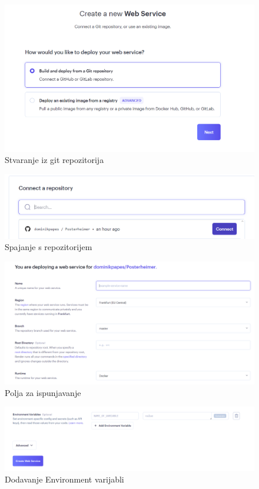 			\begin{figure} [H]
				\includegraphics[width=\linewidth]{Slike/Stvaranje iz git repozitorija}
				\caption{Stvaranje iz git repozitorija}
			\end{figure}
			
			\begin{figure} [H]
				\includegraphics[width=\linewidth]{Slike/Spajanje s repozitorijem}
				\caption{Spajanje s repozitorijem}
			\end{figure}
			
			\begin{figure} [H]
				\includegraphics[width=\linewidth]{Slike/Polja za ispunjavanje}
				\caption{Polja za ispunjavanje}
			\end{figure}
			
			\begin{figure} [H]
				\includegraphics[width=\linewidth]{Slike/Dodavanje Environment varijabli}
				\caption{Dodavanje Environment varijabli}
			\end{figure}
			

